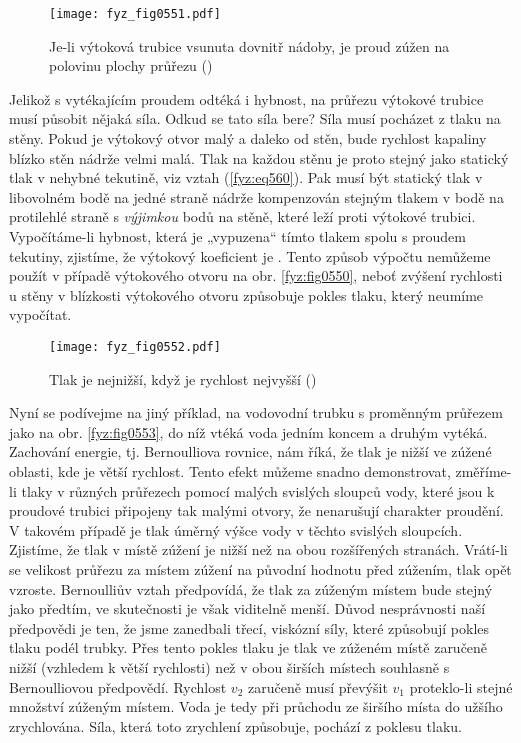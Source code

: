     \begin{figure}[ht!] %
      \centering
      \texttt{[image: fyz\_fig0551.pdf]}
      \caption{Je-li výtoková trubice vsunuta dovnitř nádoby, je proud zúžen na polovinu plochy 
               průřezu
               (\cite[s.~750]{Feynman02})}
      \label{fyz:fig0551}
    \end{figure}
    
    Jelikož s vytékajícím proudem odtéká i hybnost, na průřezu výtokové trubice musí působit nějaká 
    síla. Odkud se tato síla bere? Síla musí pocházet z tlaku na stěny. Pokud je výtokový otvor 
    malý a daleko od stěn, bude rychlost kapaliny blízko stěn nádrže velmi malá. Tlak na každou 
    stěnu je proto stejný jako statický tlak v nehybné tekutině, viz vztah (\ref{fyz:eq560}). Pak 
    musí být statický tlak v libovolném bodě na jedné straně nádrže kompenzován stejným tlakem v 
    bodě na protilehlé straně s \emph{výjimkou} bodů na stěně, které leží proti výtokové trubici. 
    Vypočítáme-li hybnost, která je „vypuzena“ tímto tlakem spolu s proudem tekutiny, zjistíme, že 
    výtokový koeficient je . Tento způsob výpočtu nemůžeme použít v případě výtokového 
    otvoru na obr. \ref{fyz:fig0550}, neboť zvýšení rychlosti u stěny v blízkosti výtokového otvoru 
    způsobuje pokles tlaku, který neumíme vypočítat.

    \begin{figure}[ht!] %
      \centering
      \texttt{[image: fyz\_fig0552.pdf]}
      \caption{Tlak je nejnižší, když je rychlost nejvyšší
               (\cite[s.~751]{Feynman02})}
      \label{fyz:fig0552}
    \end{figure}
    
    Nyní se podívejme na jiný příklad, na vodovodní trubku s proměnným průřezem jako na obr. 
    \ref{fyz:fig0553}, do níž vtéká voda jedním koncem a druhým vytéká. Zachování energie, tj. 
    Bernoulliova rovnice, nám říká, že tlak je nižší ve zúžené oblasti, kde je větší rychlost. 
    Tento efekt můžeme snadno demonstrovat, změříme-li tlaky v různých průřezech pomocí malých 
    svislých sloupců vody, které jsou k proudové trubici připojeny tak malými otvory, že nenarušují 
    charakter proudění. V takovém případě je tlak úměrný výšce vody v těchto svislých sloupcích. 
    Zjistíme, že tlak v místě zúžení je nižší než na obou rozšířených stranách. Vrátí-li se 
    velikost průřezu za místem zúžení na původní hodnotu před zúžením, tlak opět vzroste. 
    Bernoulliův vztah předpovídá, že tlak za zúženým místem bude stejný jako předtím, ve 
    skutečnosti je však viditelně menší. Důvod nesprávnosti naší předpovědi je ten, že jsme 
    zanedbali třecí, viskózní síly, které způsobují pokles tlaku podél trubky. Přes tento pokles 
    tlaku je tlak ve zúženém místě zaručeně nižší (vzhledem k větší rychlosti) než v obou širších 
    místech souhlasně s Bernoulliovou předpovědí. Rychlost \(v_2\) zaručeně musí převýšit \(v_1\) 
    proteklo-li stejné množství zúženým místem. Voda je tedy při průchodu ze širšího místa do 
    užšího zrychlována. Síla, která toto zrychlení způsobuje, pochází z poklesu tlaku.
    
